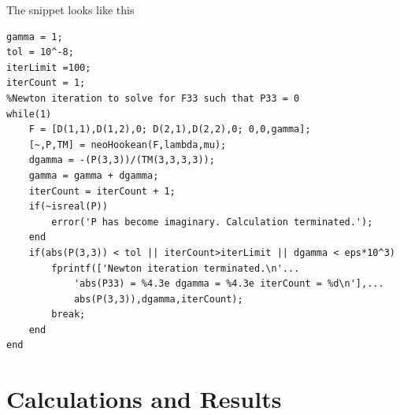 \message{ !name(p2.tex)}\documentclass[../main.tex]{subfiles}
\begin{document}
The snippet looks like this
\begin{lstlisting}[style=Matlab-editor]
%Initial guess for F33 i.e. gamma and initialize P
gamma = 1;
tol = 10^-8;
iterLimit =100;
iterCount = 1;
%Newton iteration to solve for F33 such that P33 = 0
while(1)
    F = [D(1,1),D(1,2),0; D(2,1),D(2,2),0; 0,0,gamma];
    [~,P,TM] = neoHookean(F,lambda,mu);
    dgamma = -(P(3,3))/(TM(3,3,3,3));
    gamma = gamma + dgamma;
    iterCount = iterCount + 1;
    if(~isreal(P))
        error('P has become imaginary. Calculation terminated.');
    end
    if(abs(P(3,3)) < tol || iterCount>iterLimit || dgamma < eps*10^3)
        fprintf(['Newton iteration terminated.\n'...
            'abs(P33) = %4.3e dgamma = %4.3e iterCount = %d\n'],...
            abs(P(3,3)),dgamma,iterCount);
        break;
    end
end
\end{lstlisting}

\section{Calculations and Results}
\lstset{
basicstyle=\ttfamily,
columns=fixed
}
\end{document}

